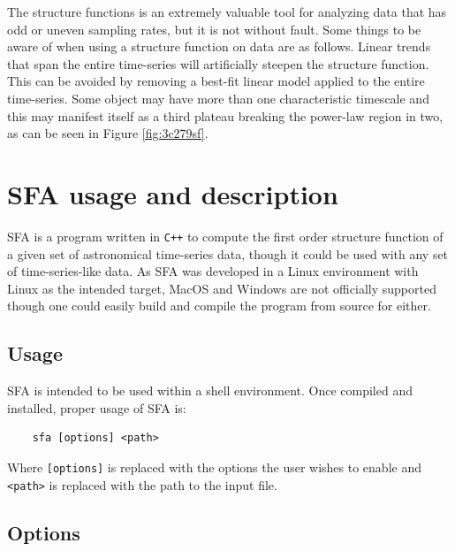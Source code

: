 \documentclass[12pt, oneside]{smuthesis}
\begin{document}
The structure functions is an extremely valuable tool for analyzing data that has odd or uneven sampling rates, but it is not without fault. Some things to be aware of when using a structure function on data are as follows. Linear trends that span the entire time-series will artificially steepen the structure function. This can be avoided by removing a best-fit linear model applied to the entire time-series. Some object may have more than one characteristic timescale and this may manifest itself as a third plateau breaking the power-law region in two, as can be seen in Figure \ref{fig:3c279sf}.

\section{\sc SFA usage and description} \label{usageDescription}

SFA is a program written in \verb|C++| to compute the first order structure function of a given set of astronomical time-series data, though it could be used with any set of time-series-like data. As SFA was developed in a Linux environment with Linux as the intended target, MacOS and Windows are not officially supported though one could easily build and compile the program from source for either.

\subsection{\sc Usage}

SFA is intended to be used within a shell environment. Once compiled and installed, proper usage of SFA is:
\begin{center}
	\begin{BVerbatim}
	sfa [options] <path>
	\end{BVerbatim}
\end{center}
Where \verb|[options]| is replaced with the options the user wishes to enable and \verb|<path>| is replaced with the path to the input file.

\subsection{\sc Options}
\end{document}
